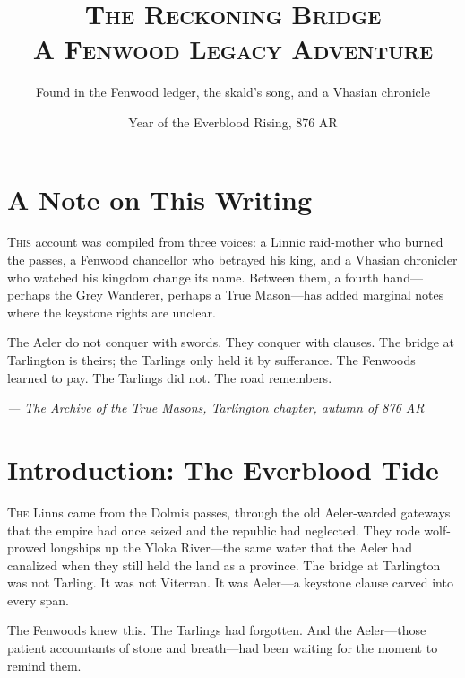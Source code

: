 \documentclass[11pt]{book}
\begin{document}
\frontmatter
\title{\Huge\scshape The Reckoning Bridge\\\large A Fenwood Legacy Adventure}
\author{Found in the Fenwood ledger, the skald's song, and a Vhasian chronicle}
\date{Year of the Everblood Rising, 876 AR}
\maketitle

\tableofcontents

\mainmatter

\chapter*{A Note on This Writing}
\lettrine{T}{his} account was compiled from three voices: a Linnic raid-mother who burned the passes, a Fenwood chancellor who betrayed his king, and a Vhasian chronicler who watched his kingdom change its name. Between them, a fourth hand---perhaps the Grey Wanderer, perhaps a True Mason---has added marginal notes where the keystone rights are unclear.

The Aeler do not conquer with swords. They conquer with clauses. The bridge at Tarlington is theirs; the Tarlings only held it by sufferance. The Fenwoods learned to pay. The Tarlings did not. The road remembers.

\vspace{1em}
\noindent\textit{--- The Archive of the True Masons, Tarlington chapter, autumn of 876 AR}

\clearpage

\chapter{Introduction: The Everblood Tide}

\lettrine{T}{he} Linns came from the Dolmis passes, through the old Aeler-warded gateways that the empire had once seized and the republic had neglected. They rode wolf-prowed longships up the Yloka River---the same water that the Aeler had canalized when they still held the land as a province. The bridge at Tarlington was not Tarling. It was not Viterran. It was Aeler---a keystone clause carved into every span.

The Fenwoods knew this. The Tarlings had forgotten. And the Aeler---those patient accountants of stone and breath---had been waiting for the moment to remind them.
\end{document}
